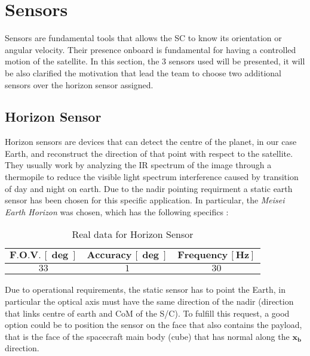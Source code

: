 \section{Sensors}
\label{sec:sensors}

Sensors are fundamental tools that allows the SC to know its orientation or angular velocity. Their presence onboard 
is fundamental for having a controlled motion of the satellite. In this section, the 3 sensors used will be presented, 
it will be also clarified the motivation that lead the team to choose two additional sensors over the horizon sensor 
assigned. 

\subsection{Horizon Sensor}
\label{subsec:horizon_sensor}

Horizon sensors are devices that can detect the centre of the planet, in our case Earth, and reconstruct the direction 
of that point with respect to the satellite. They usually work by analyzing the IR spectrum of the image through a thermopile
to reduce the visible light spectrum interference caused by transition of day and night on earth. 
Due to the nadir pointing requirment a static earth sensor has been chosen for this specific application. In particular, the 
\textit{Meisei Earth Horizon} was chosen, which has the following specifics \cite{horizon_sensor_site}:

\begin{table}[H]

    \centering
    \begin{tabular}{|c|c|c|}
    \hline
    $\bm{F.O.V. \, [\deg]}$ & $\bm{Accuracy \, [\deg]}$ & $\bm{Frequency \, [Hz]}$ \\
    \hline
    $33$ & $1$ & $30$  \\
    \hline
    \end{tabular}
    
    \caption{Real data for Horizon Sensor}
    \label{table:Hor_sensor}
    
\end{table}

Due to operational requirements, the static sensor has to point the Earth, in particular the optical
axis must have the same direction of the nadir (direction that links centre of earth and CoM of the S/C).
To fulfill this request, a good option could be to position the sensor on the face that also contains the 
payload, that is the face of the spacecraft main body (cube) that has normal along the $\boldsymbol{x_b}$ 
direction. 

